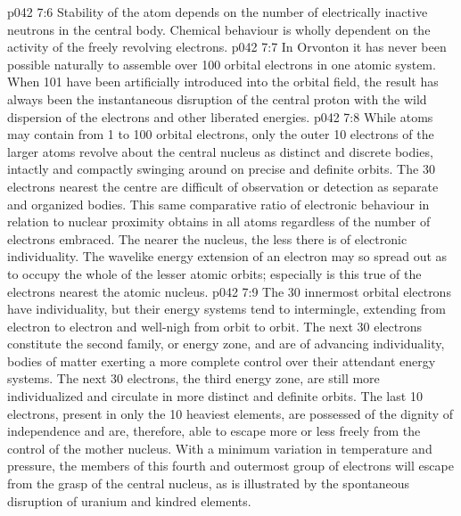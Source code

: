 \vs p042 7:6 Stability of the atom depends on the number of electrically inactive neutrons in the central body. Chemical behaviour is wholly dependent on the activity of the freely revolving electrons.
\vs p042 7:7 \pc In Orvonton it has never been possible naturally to assemble over 100 orbital electrons in one atomic system. When 101 have been artificially introduced into the orbital field, the result has always been the instantaneous disruption of the central proton with the wild dispersion of the electrons and other liberated energies.
\vs p042 7:8 \pc While atoms may contain from 1 to 100 orbital electrons, only the outer 10 electrons of the larger atoms revolve about the central nucleus as distinct and discrete bodies, intactly and compactly swinging around on precise and definite orbits. The 30 electrons nearest the centre are difficult of observation or detection as separate and organized bodies. This same comparative ratio of electronic behaviour in relation to nuclear proximity obtains in all atoms regardless of the number of electrons embraced. The nearer the nucleus, the less there is of electronic individuality. The wavelike energy extension of an electron may so spread out as to occupy the whole of the lesser atomic orbits; especially is this true of the electrons nearest the atomic nucleus.
\vs p042 7:9 The 30 innermost orbital electrons have individuality, but their energy systems tend to intermingle, extending from electron to electron and well\hyp{}nigh from orbit to orbit. The next 30 electrons constitute the second family, or energy zone, and are of advancing individuality, bodies of matter exerting a more complete control over their attendant energy systems. The next 30 electrons, the third energy zone, are still more individualized and circulate in more distinct and definite orbits. The last 10 electrons, present in only the 10 heaviest elements, are possessed of the dignity of independence and are, therefore, able to escape more or less freely from the control of the mother nucleus. With a minimum variation in temperature and pressure, the members of this fourth and outermost group of electrons will escape from the grasp of the central nucleus, as is illustrated by the spontaneous disruption of uranium and kindred elements.
